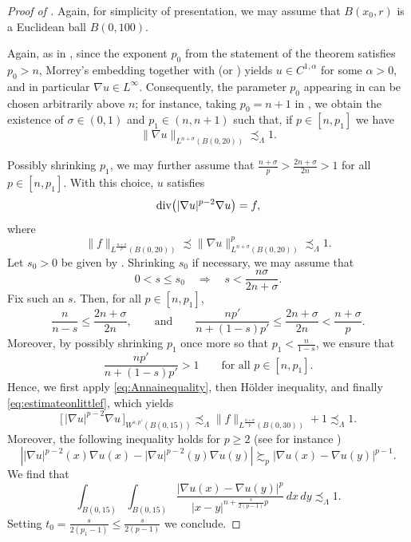 \documentclass[12pt]{amsart}
\renewcommand{\div}{{\rm div}}
\newcommand{\abs}[1]{\left |#1 \right |}
\numberwithin{theorem}{section} \numberwithin{equation}{section}
\newcommand{\aleq}{\precsim}
\newcommand{\ageq}{\succsim}
\begin{document}
\begin{proof}[Proof of ]
Again, for simplicity of presentation, we may assume that $B(x_0,r)$ is a Euclidean ball $B(0,100)$.

Again, as in , since the exponent $p_0$ from the statement of the theorem satisfies $p_0>n$, Morrey’s embedding together with \cite[Section~3]{HLp} (or \cite[Theorem 1.3]{M2025}) yields $u\in C^{1,\alpha}$ for some $\alpha>0$, and in particular $\nabla u\in L^\infty$.
Consequently, the parameter $p_0$ appearing in  can be chosen arbitrarily above $n$; for instance, taking $p_0=n+1$ in , we obtain the existence of $\sigma\in(0,1)$ and $p_1\in(n,n+1)$ such that, if $p\in[n,p_1]$ we have
\[
\|\nabla u\|_{L^{n+\sigma}(B(0,20))} \aleq_\Lambda 1.
\]

Possibly shrinking $p_1$, we may further assume that $\frac{n+\sigma}{p}>\frac{2n+\sigma}{2n}>1$ for all $p\in[n,p_1]$.
With this choice, $u$ satisfies
\[
\div \bigl(|\nabla u|^{p-2}\nabla u\bigr)=f,
\]
where
\begin{equation}\label{eq:estimateonlittlef}
\|f\|_{L^{\frac{n+\sigma}{p}}(B(0,20))}
\aleq
\|\nabla u\|_{L^{n+\sigma}(B(0,20))}^{p}
\aleq_\Lambda 1.
\end{equation}
Let $s_0>0$ be given by . Shrinking $s_0$ if necessary, we may assume that
\[
0<s\le s_0
\quad\Longrightarrow\quad
s<\frac{n\sigma}{2n+\sigma}.
\]
Fix such an $s$. Then, for all $p\in[n,p_1]$,
\[
\frac{n}{n-s}\le \frac{2n+\sigma}{2n},
\qquad \text{and} \qquad 
\frac{np'}{n+(1-s)p'}\le \frac{2n+\sigma}{2n} < \frac{n+\sigma}{p}.
\]
Moreover, by possibly shrinking $p_1$ once more so that $p_1<\frac{n}{1-s}$, we ensure that
\[
\frac{np'}{n+(1-s)p'}>1
\qquad\text{for all } p\in[n,p_1].
\]
Hence, we first apply \eqref{eq:Annainequality}, then H\"{o}lder inequality, and finally \eqref{eq:estimateonlittlef}, which yields
\[
\bigl[\,|\nabla u|^{p-2}\nabla u\,\bigr]_{W^{s,p'}(B(0,15))}
\aleq_\Lambda
\|f\|_{L^{\frac{n+\sigma}{p}}(B(0,30))}+1
\aleq_\Lambda 1.
\]
Moreover, the following inequality holds for $p \geq 2$ (see for instance \cite[Lemma 2.3.7]{M})
\[
 \abs{|\nabla u|^{p-2}(x) \nabla u(x)-|\nabla u|^{p-2}(y) \nabla u(y)} \ageq_{p} \abs{\nabla u(x)-\nabla u(y)}^{p-1}.
\]
We find that
\[
 \int_{B(0,15)}\int_{B(0,15)} \frac{\abs{\nabla u(x)- \nabla u(y)}^{p}}{|x-y|^{n+\frac{s}{2(p-1)} p}}\, dx\, dy \aleq_{\Lambda}1. 
\]
Setting $t_0 = \frac{s}{2(p_1-1)} \leq \frac{s}{2(p-1)}$ we conclude.
\end{proof}
\end{document}
